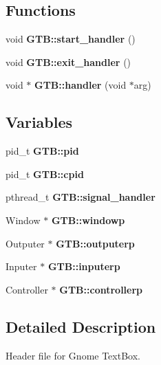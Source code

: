 \subsection*{Functions}
\begin{DoxyCompactItemize}
\item 
\mbox{\label{a00005_a2391b249904a79df4d2c8c18807f1f12}} 
void {\bfseries G\+T\+B\+::start\+\_\+handler} ()
\item 
\mbox{\label{a00005_a21bbd3fc9a78473e3ff815a1173cb3a5}} 
void {\bfseries G\+T\+B\+::exit\+\_\+handler} ()
\item 
\mbox{\label{a00005_a4cc5ca0cc64dd02e182a205aa9e43d98}} 
void $\ast$ {\bfseries G\+T\+B\+::handler} (void $\ast$arg)
\end{DoxyCompactItemize}
\subsection*{Variables}
\begin{DoxyCompactItemize}
\item 
\mbox{\label{a00005_a5461c31dafd891ad83e4067f7c0f4a2a}} 
pid\+\_\+t {\bfseries G\+T\+B\+::pid}
\item 
\mbox{\label{a00005_adf9666705cf4df93b7ac84e30e261765}} 
pid\+\_\+t {\bfseries G\+T\+B\+::cpid}
\item 
\mbox{\label{a00005_ad0774f3a41eb220ccdc9a62454107126}} 
pthread\+\_\+t {\bfseries G\+T\+B\+::signal\+\_\+handler}
\item 
\mbox{\label{a00005_a2547da65375d499a51310ded1bf573ff}} 
Window $\ast$ {\bfseries G\+T\+B\+::windowp}
\item 
\mbox{\label{a00005_a4aa97affbe5994c68285edc925c96813}} 
Outputer $\ast$ {\bfseries G\+T\+B\+::outputerp}
\item 
\mbox{\label{a00005_acbcc12994db465994d3f1f124aece58f}} 
Inputer $\ast$ {\bfseries G\+T\+B\+::inputerp}
\item 
\mbox{\label{a00005_ad22c9e8fc050fba17a9550998ed35a1c}} 
Controller $\ast$ {\bfseries G\+T\+B\+::controllerp}
\end{DoxyCompactItemize}


\subsection{Detailed Description}
Header file for Gnome Text\+Box. 

